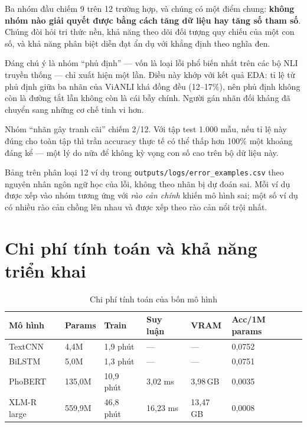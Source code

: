 \documentclass[12pt,a4paper,oneside]{report}
\begin{document}
Ba nhóm đầu chiếm 9 trên 12 trường hợp, và chúng có một điểm chung: \textbf{không nhóm
nào giải quyết được bằng cách tăng dữ liệu hay tăng số tham số}. Chúng đòi hỏi tri thức
nền, khả năng theo dõi đối tượng quy chiếu của một con số, và khả năng phân biệt diễn đạt
ẩn dụ với khẳng định theo nghĩa đen.

Đáng chú ý là nhóm ``phủ định'' --- vốn là loại lỗi phổ biến nhất trên các bộ NLI truyền
thống --- chỉ xuất hiện một lần. Điều này khớp với kết quả EDA: tỉ lệ từ phủ định giữa ba
nhãn của ViANLI khá đồng đều (12--17\%), nên phủ định không còn là đường tắt lẫn không còn
là cái bẫy chính. Người gán nhãn đối kháng đã chuyển sang những cơ chế tinh vi hơn.

Nhóm ``nhãn gây tranh cãi'' chiếm 2/12. Với tập test 1.000 mẫu, nếu tỉ lệ này đúng cho
toàn tập thì trần accuracy thực tế có thể thấp hơn 100\% một khoảng đáng kể --- một lý do
nữa để không kỳ vọng con số cao trên bộ dữ liệu này.

\begin{notebox}
Bảng trên phân loại 12 ví dụ trong \texttt{outputs/logs/error\_examples.csv} theo nguyên
nhân ngôn ngữ học của lỗi, không theo nhãn bị dự đoán sai. Mỗi ví dụ được xếp vào nhóm
tương ứng với \textit{rào cản chính} khiến mô hình sai; một số ví dụ có nhiều rào cản
chồng lên nhau và được xếp theo rào cản nổi trội nhất.
\end{notebox}

\section{Chi phí tính toán và khả năng triển khai}

\begin{table}[H]
\centering
\small
\caption{Chi phí tính toán của bốn mô hình}
\begin{tabularx}{\textwidth}{@{}L{3.4cm}C{1.8cm}C{1.9cm}C{1.8cm}C{1.7cm}C{2.2cm}@{}}
\toprule
\textbf{Mô hình} & \textbf{Params} & \textbf{Train} & \textbf{Suy luận} &
\textbf{VRAM} & \textbf{Acc/1M params} \\
\midrule
TextCNN     & 4,4M   & 1,9 phút  & ---       & ---        & 0,0752 \\
BiLSTM      & 5,0M   & 1,3 phút  & ---       & ---        & 0,0751 \\
PhoBERT     & 135,0M & 10,9 phút & 3,02 ms   & 3,98\,GB   & 0,0035 \\
XLM-R large & 559,9M & 46,8 phút & 16,23 ms  & 13,47\,GB  & 0,0008 \\
\bottomrule
\end{tabularx}
\end{table}
\end{document}
